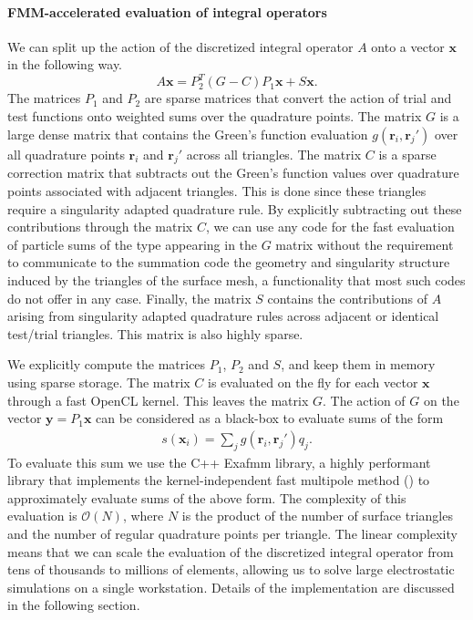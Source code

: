\paragraph{FMM-accelerated evaluation of integral operators}
We can split up the action of the discretized integral operator $A$ onto a vector $\mathbf{x}$ in the following way.
\begin{equation}
\label{eq:bempp_fmm_matvec}
A\mathbf{x} = P_2^T (G - C)P_1 \mathbf{x} + S \mathbf{x}.
\end{equation}
The matrices $P_1$ and $P_2$ are sparse matrices that convert the action of trial and test functions onto weighted sums over the quadrature points.
The matrix $G$ is a large dense matrix that contains the Green's function evaluation $g(\mathbf{r}_i, \mathbf{r}_j')$ over all quadrature points $\mathbf{r}_i$ and $\mathbf{r}_j'$ across all triangles.
The matrix $C$ is a sparse correction matrix that subtracts out the Green's function values over quadrature points associated with  adjacent triangles.
This is done since these triangles require a singularity adapted quadrature rule.
By explicitly subtracting out these contributions through the matrix $C$, we can use any code for the fast evaluation of particle sums of the type appearing in the $G$ matrix without the requirement to communicate to the summation code the geometry and singularity structure induced by the triangles of the surface mesh, a functionality that most such codes do not offer in any case.
Finally, the matrix $S$ contains the contributions of $A$ arising from singularity adapted quadrature rules across adjacent or identical test/trial triangles.
This matrix is also highly sparse.

We explicitly compute the matrices $P_1$, $P_2$ and $S$, and keep them in memory using sparse storage.
The matrix $C$ is evaluated on the fly for each vector $\mathbf{x}$ through a fast OpenCL kernel.
This leaves the matrix $G$.
The action of $G$ on the vector $\mathbf{y}=P_1 \mathbf{x}$ can be considered as a black-box to evaluate sums of the form
%
\begin{align}\label{eq:nbody_sum}
s(\mathbf{x}_i) = \sum_j g(\mathbf{r}_i, \mathbf{r}_j')q_j.
\end{align}
%
To evaluate this sum we use the C++ Exafmm library, a highly performant library that implements the kernel-independent fast multipole method (\kifmm) to approximately evaluate sums of the above form.
The complexity of this evaluation is $\mathcal{O}(N)$, where $N$ is the product of the number of surface triangles and the number of regular quadrature points per triangle.
The linear complexity means that we can scale the evaluation of the discretized integral operator from tens of thousands to millions of elements, allowing us to solve large electrostatic simulations on a single workstation. Details of the \fmm implementation are discussed in the following section.
